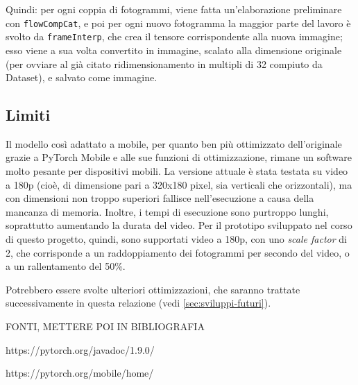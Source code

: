 Quindi: per ogni coppia di fotogrammi, viene fatta un'elaborazione preliminare con
\texttt{flowCompCat}, e poi per ogni nuovo fotogramma la maggior parte del lavoro è svolto da
\texttt{frameInterp}, che crea il tensore corrispondente alla nuova immagine; esso viene a sua
volta convertito in immagine, scalato alla dimensione originale (per ovviare al già 
citato ridimensionamento in multipli di 32 compiuto da Dataset), e salvato come immagine.

\subsection{Limiti}

Il modello così adattato a mobile, per quanto ben più ottimizzato dell'originale grazie a
PyTorch Mobile e alle sue funzioni di ottimizzazione, rimane un software molto pesante per
dispositivi mobili. La versione attuale è stata testata su video a 180p (cioè, di dimensione
pari a 320x180 pixel, sia verticali che orizzontali), ma con dimensioni non troppo superiori
fallisce nell'esecuzione a causa della mancanza di memoria. Inoltre, i tempi di esecuzione
sono purtroppo lunghi, soprattutto aumentando la durata del video. Per il prototipo sviluppato 
nel corso di questo progetto, quindi, sono supportati video a 180p, con uno \emph{scale factor} 
di 2, che corrisponde a un raddoppiamento dei fotogrammi per secondo del video, o a un
rallentamento del 50\%.

Potrebbero essere svolte ulteriori ottimizzazioni, che saranno trattate successivamente 
in questa relazione (vedi \ref{sec:sviluppi-futuri}).

FONTI, METTERE POI IN BIBLIOGRAFIA

https://pytorch.org/javadoc/1.9.0/

https://pytorch.org/mobile/home/